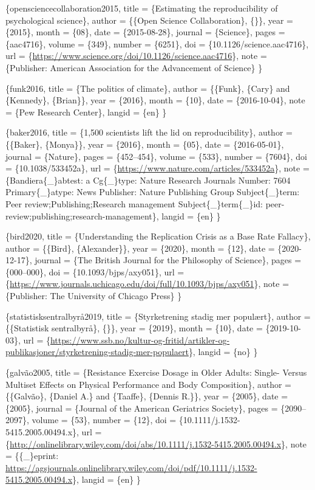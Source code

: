 \documentclass[
]{book}
\begin{document}
\citet{article}\{opensciencecollaboration2015,
title = \{Estimating the reproducibility of psychological science\},
author = \{\{Open Science Collaboration\}, \{\}\},
year = \{2015\},
month = \{08\},
date = \{2015-08-28\},
journal = \{Science\},
pages = \{aac4716\},
volume = \{349\},
number = \{6251\},
doi = \{10.1126/science.aac4716\},
url = \{\url{https://www.science.org/doi/10.1126/science.aac4716}\},
note = \{Publisher: American Association for the Advancement of Science\}
\}

\citet{article}\{funk2016,
title = \{The politics of climate\},
author = \{\{Funk\}, \{Cary\} and \{Kennedy\}, \{Brian\}\},
year = \{2016\},
month = \{10\},
date = \{2016-10-04\},
note = \{Pew Research Center\},
langid = \{en\}
\}

\citet{article}\{baker2016,
title = \{1,500 scientists lift the lid on reproducibility\},
author = \{\{Baker\}, \{Monya\}\},
year = \{2016\},
month = \{05\},
date = \{2016-05-01\},
journal = \{Nature\},
pages = \{452--454\},
volume = \{533\},
number = \{7604\},
doi = \{10.1038/533452a\},
url = \{\url{https://www.nature.com/articles/533452a}\},
note = \{Bandiera\{\_\}abtest: a
Cg\{\_\}type: Nature Research Journals
Number: 7604
Primary\{\_\}atype: News
Publisher: Nature Publishing Group
Subject\{\_\}term: Peer review;Publishing;Research management
Subject\{\_\}term\{\_\}id: peer-review;publishing;research-management\},
langid = \{en\}
\}

\citet{article}\{bird2020,
title = \{Understanding the Replication Crisis as a Base Rate Fallacy\},
author = \{\{Bird\}, \{Alexander\}\},
year = \{2020\},
month = \{12\},
date = \{2020-12-17\},
journal = \{The British Journal for the Philosophy of Science\},
pages = \{000--000\},
doi = \{10.1093/bjps/axy051\},
url = \{\url{https://www.journals.uchicago.edu/doi/full/10.1093/bjps/axy051}\},
note = \{Publisher: The University of Chicago Press\}
\}

\citet{misc}\{statistisksentralbyrå2019,
title = \{Styrketrening stadig mer populært\},
author = \{\{Statistisk sentralbyrå\}, \{\}\},
year = \{2019\},
month = \{10\},
date = \{2019-10-03\},
url = \{\url{https://www.ssb.no/kultur-og-fritid/artikler-og-publikasjoner/styrketrening-stadig-mer-populaert}\},
langid = \{no\}
\}

\citet{article}\{galvão2005,
title = \{Resistance Exercise Dosage in Older Adults: Single- Versus Multiset Effects on Physical Performance and Body Composition\},
author = \{\{Galvão\}, \{Daniel A.\} and \{Taaffe\}, \{Dennis R.\}\},
year = \{2005\},
date = \{2005\},
journal = \{Journal of the American Geriatrics Society\},
pages = \{2090--2097\},
volume = \{53\},
number = \{12\},
doi = \{10.1111/j.1532-5415.2005.00494.x\},
url = \{\url{http://onlinelibrary.wiley.com/doi/abs/10.1111/j.1532-5415.2005.00494.x}\},
note = \{\{\_\}eprint: \url{https://agsjournals.onlinelibrary.wiley.com/doi/pdf/10.1111/j.1532-5415.2005.00494.x}\},
langid = \{en\}
\}
\end{document}
